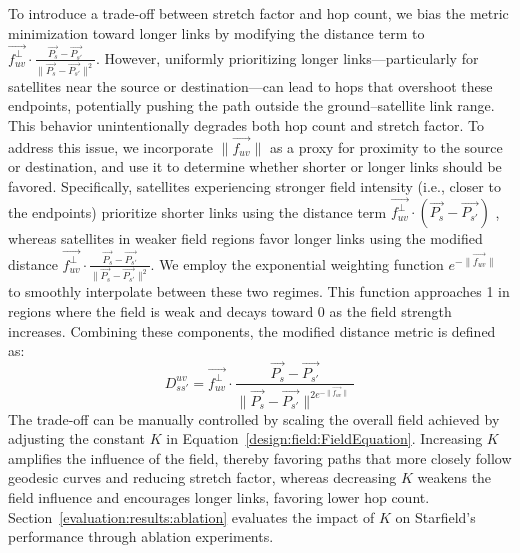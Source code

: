 \documentclass[acmsmall, screen]{acmart}
\begin{document}
To introduce a trade-off between stretch factor and hop count, we bias the metric minimization toward longer links by modifying the distance term to $\vec{f^{\perp}_{uv}} \cdot \frac{\vec{P_s} - \vec{P_{s'}}}{\|\vec{P_s} - \vec{P_{s'}}\|^2}$. However, uniformly prioritizing longer links—particularly for satellites near the source or destination—can lead to hops that overshoot these endpoints, potentially pushing the path outside the ground–satellite link range. This behavior unintentionally degrades both hop count and stretch factor. To address this issue, we incorporate $\|\vec{f_{uv}}\|$ as a proxy for proximity to the source or destination, and use it to determine whether shorter or longer links should be favored. Specifically, satellites experiencing stronger field intensity (i.e., closer to the endpoints) prioritize shorter links using the distance term  $\vec{f^{\perp}_{uv}} \cdot (\vec{P_s} - \vec{P_{s'}})$ , whereas satellites in weaker field regions favor longer links using the modified distance $\vec{f^{\perp}_{uv}} \cdot \frac{\vec{P_s} - \vec{P_{s'}}}{\|\vec{P_s} - \vec{P_{s'}}\|^2}$. We employ the exponential weighting function $e^{-\|\vec{f_{uv}}\|}$ to smoothly interpolate between these two regimes. This function approaches 1 in regions where the field is weak and decays toward 0 as the field strength increases. Combining these components, the modified distance metric is defined as:
\begin{equation}\label{design:considerations:priority:formula}
    D^{uv}_{ss'} = \vec{f^{\perp}_{uv}} \cdot \frac{\vec{P_s} - \vec{P_{s'}}}{\|\vec{P_s} - \vec{P_{s'}}\|^{2e^{-\|\vec{f_{uv}}\|}}}
\end{equation}
The trade-off can be manually controlled by scaling the overall field achieved by adjusting the constant $K$ in Equation~\ref{design:field:FieldEquation}. Increasing $K$ amplifies the influence of the field, thereby favoring paths that more closely follow geodesic curves and reducing stretch factor, whereas decreasing $K$ weakens the field influence and encourages longer links, favoring lower hop count. Section~\ref{evaluation:results:ablation} evaluates the impact of $K$ on Starfield’s performance through ablation experiments.
\end{document}
